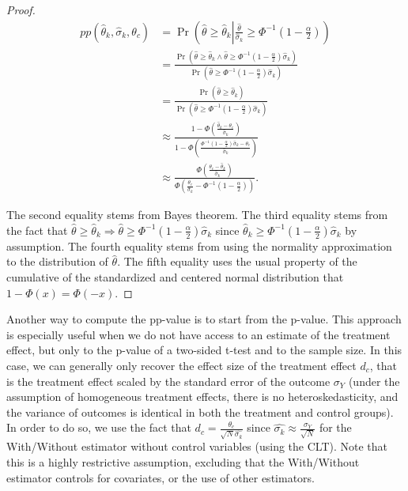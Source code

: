 \documentclass[]{book}
\theoremstyle{definition}
\theoremstyle{definition}
\theoremstyle{definition}
\theoremstyle{remark}
\let\BeginKnitrBlock\begin \let\EndKnitrBlock\end
\begin{document}
\BeginKnitrBlock{proof}
\iffalse{} {Proof. } \fi{}\begin{align*}
  pp(\hat{\theta}_k,\hat{\sigma}_k,\theta_c) & = \Pr\left(\hat{\theta}\geq\hat{\theta}_k\left|\frac{\hat{\theta}}{\hat{\sigma}_k}
                                                    \geq\Phi^{-1}\left(1-\frac{\alpha}{2}\right)\right.\right)\\
                                              & = \frac{\Pr\left(\hat{\theta}\geq\hat{\theta}_k\land\hat{\theta}\geq\Phi^{-1}\left(1-\frac{\alpha}{2}\right)\hat{\sigma}_k\right)}
            {\Pr\left(\hat{\theta}\geq\Phi^{-1}\left(1-\frac{\alpha}{2}\right)\hat{\sigma}_k\right)} \\
              & = \frac{\Pr\left(\hat{\theta}\geq\hat{\theta}_k\right)}
            {\Pr\left(\hat{\theta}\geq\Phi^{-1}\left(1-\frac{\alpha}{2}\right)\hat{\sigma}_k\right)} \\
  & \approx \frac{1-\Phi\left(\frac{\hat{\theta}_k-\theta_c}{\hat{\sigma}_k}\right)}
                                                      {1-\Phi\left(\frac{\Phi^{-1}\left(1-\frac{\alpha}{2}\right)\hat{\sigma}_k-\theta_c}
                                                                  {\hat{\sigma}_k}\right)}\\
 & \approx \frac{\Phi\left(\frac{\theta_c-\hat{\theta}_k}{\hat{\sigma}_k}\right)}
                                                      {\Phi\left(\frac{\theta_c}{\hat{\sigma}_k}-\Phi^{-1}\left(1-\frac{\alpha}{2}\right)\right)}.
\end{align*}

The second equality stems from Bayes theorem.
The third equality stems from the fact that \(\hat{\theta}\geq\hat{\theta}_k\Rightarrow\hat{\theta}\geq\Phi^{-1}\left(1-\frac{\alpha}{2}\right)\hat{\sigma}_k\) since \(\hat{\theta}_k\geq\Phi^{-1}\left(1-\frac{\alpha}{2}\right)\hat{\sigma}_k\) by assumption.
The fourth equality stems from using the normality approximation to the distribution of \(\hat{\theta}\).
The fifth equality uses the usual property of the cumulative of the standardized and centered normal distribution that \(1-\Phi(x)=\Phi(-x)\).
\EndKnitrBlock{proof}

Another way to compute the pp-value is to start from the p-value.
This approach is especially useful when we do not have access to an estimate of the treatment effect, but only to the p-value of a two-sided t-test and to the sample size.
In this case, we can generally only recover the effect size of the treatment effect \(d_c\), that is the treatment effect scaled by the standard error of the outcome \(\sigma_{Y}\) (under the assumption of homogeneous treatment effects, there is no heteroskedasticity, and the variance of outcomes is identical in both the treatment and control groups).
In order to do so, we use the fact that \(d_c=\frac{\theta_c}{\sqrt{N}\hat{\sigma_k}}\) since \(\hat{\sigma_k}\approx\frac{\sigma_{Y}}{\sqrt{N}}\) for the With/Without estimator without control variables (using the CLT).
Note that this is a highly restrictive assumption, excluding that the With/Without estimator controls for covariates, or the use of other estimators.
\end{document}
